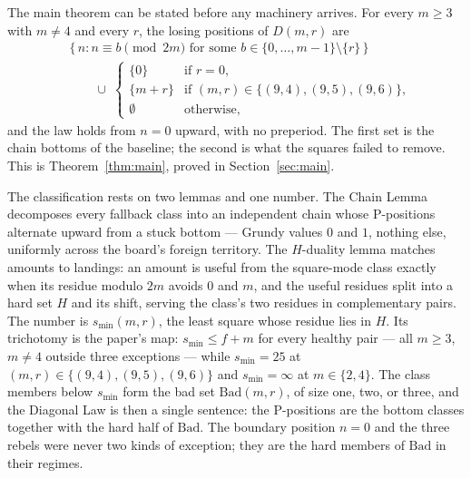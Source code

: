The main theorem can be stated before any machinery arrives. For every
$m \ge 3$ with $m \ne 4$ and every $r$, the losing positions of $D(m,r)$
are
\[
\begin{aligned}
  &\{\, n : n \equiv b \pmod{2m} \text{ for some } b \in \{0, \ldots, m-1\}
  \setminus \{r\} \,\} \\
  &\qquad \cup\;
  \begin{cases}
    \{0\} & \text{if } r = 0,\\
    \{m + r\} & \text{if } (m,r) \in \{(9,4),(9,5),(9,6)\},\\
    \emptyset & \text{otherwise,}
  \end{cases}
\end{aligned}
\]
and the law holds from $n = 0$ upward, with no preperiod. The first set is
the chain bottoms of the baseline; the second is what the squares failed
to remove. This is Theorem~\ref{thm:main}, proved in
Section~\ref{sec:main}.

The classification rests on two lemmas and one number. The Chain Lemma
decomposes every fallback class into an independent chain whose
P-positions alternate upward from a stuck bottom --- Grundy values $0$
and $1$, nothing else, uniformly across the board's foreign territory.
The $H$-duality lemma matches amounts to landings: an amount is useful
from the square-mode class exactly when its residue modulo $2m$ avoids
$0$ and $m$, and the useful residues split into a hard set $H$ and its
shift, serving the class's two residues in complementary pairs. The
number is $s_{\min}(m, r)$, the least square whose residue lies in $H$.
Its trichotomy is the paper's map: $s_{\min} \le f + m$ for every healthy
pair --- all $m \ge 3$, $m \ne 4$ outside three exceptions --- while
$s_{\min} = 25$ at $(m, r) \in \{(9,4), (9,5), (9,6)\}$ and
$s_{\min} = \infty$ at $m \in \{2, 4\}$. The class members below
$s_{\min}$ form the bad set $\mathrm{Bad}(m, r)$, of size one, two, or
three, and the Diagonal Law is then a single sentence: the P-positions
are the bottom classes together with the hard half of $\mathrm{Bad}$. The
boundary position $n = 0$ and the three rebels were never two kinds of
exception; they are the hard members of $\mathrm{Bad}$ in their regimes.

